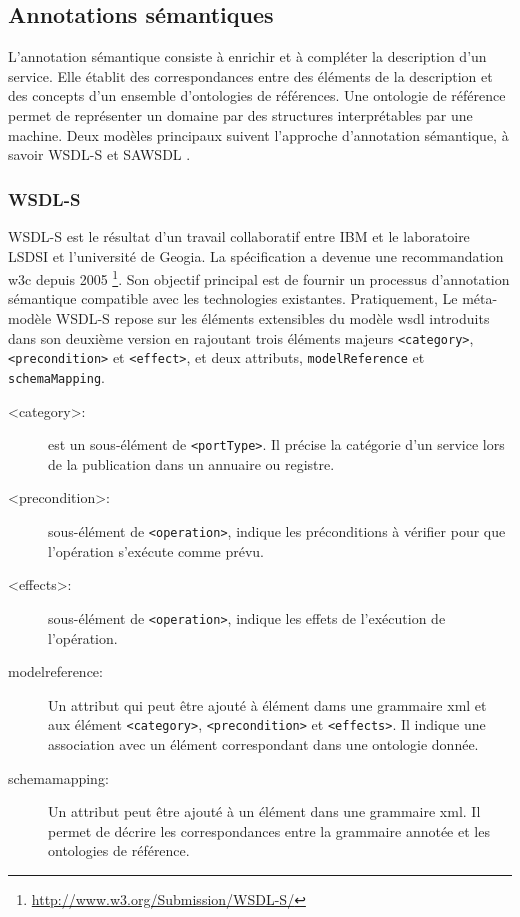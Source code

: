   \subsection{Annotations sémantiques}
  \label{sec:semantic-annotation}
  L'annotation sémantique consiste à enrichir et à compléter la
  description d'un service. Elle établit des correspondances entre des
  éléments de la description et des concepts d'un ensemble
  d'ontologies de références. Une ontologie de référence permet de
  représenter un domaine par des structures interprétables par une
  machine. Deux modèles principaux suivent l'approche d'annotation
  sémantique, à savoir \textsc{WSDL-S} et \textsc{SAWSDL}
  \cite{elie2010}.

    \subsubsection{WSDL-S}
    \textsc{WSDL-S} \cite{akkiraju2005web} est le résultat d'un
    travail collaboratif entre IBM et le laboratoire LSDSI et
    l'université de Geogia. La spécification a devenue une
    recommandation \acrshort{w3c} depuis 2005
    \footnote{\url{http://www.w3.org/Submission/WSDL-S/}}. Son
    objectif principal est de fournir un processus d'annotation
    sémantique compatible avec les technologies
    existantes. Pratiquement, Le méta-modèle \textsc{WSDL-S} repose
    sur les éléments extensibles du modèle \acrshort{wsdl} introduits
    dans son deuxième version en rajoutant trois éléments majeurs
    \texttt{<category>}, \texttt{<precondition>} et \texttt{<effect>},
    et deux attributs, \texttt{modelReference} et
    \texttt{schemaMapping}.\medskip

    \renewcommand{\descriptionlabel}[1]{\hspace{0.5cm}\textbullet~\texttt{#1}}
    \begin{description}
    \item [<category>:] est un sous-élément de \texttt{<portType>}. Il
      précise la catégorie d'un service lors de la publication dans un
      annuaire ou registre.

    \item [<precondition>:] sous-élément de \texttt{<operation>},
      indique les préconditions à vérifier pour que l'opération
      s'exécute comme prévu.

    \item [<effects>:] sous-élément de \texttt{<operation>}, indique
      les effets de l'exécution de l'opération.

    \item [modelreference:] Un attribut qui peut être ajouté à
      élément dams une grammaire \acrshort{xml} et aux élément
      \texttt{<category>}, \texttt{<precondition>} et
      \texttt{<effects>}. Il indique une association avec un élément
      correspondant dans une ontologie donnée.

    \item [schemamapping:] Un attribut peut être ajouté à un élément
      dans une grammaire \acrshort{xml}. Il permet de décrire les
      correspondances entre la grammaire annotée et les ontologies de
      référence.
    \end{description}
    \enddescription

